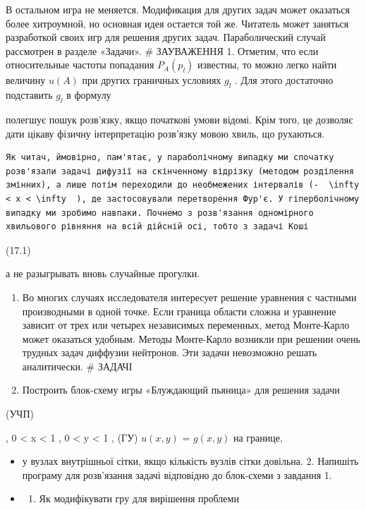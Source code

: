 \documentclass[
  ukrainian,
]{article}
\providecommand{\tightlist}{%
  \setlength{\itemsep}{0pt}\setlength{\parskip}{0pt}}
\begin{document}
В остальном игра не меняется. Модификация для других задач может
оказаться более хитроумной, но основная идея остается той же. Читатель
может заняться разработкой своих игр для решения других задач.
Параболический случай рассмотрен в разделе «Задачи». \# ЗАУВАЖЕННЯ 1.
Отметим, что если относительные частоты попадания \(P_A(p_l)\) известны,
то можно легко найти величину \(u\left(A\right)\) при других граничных
условиях \(g_l\) . Для этого достаточно подставить \(g_l\) в формулу

полегшує пошук розв'язку, якщо початкові умови відомі. Крім того, це
дозволяє дати цікаву фізичну інтерпретацію розв'язку мовою хвиль, що
рухаються.

\begin{verbatim}
Як читач, ймовірно, пам'ятає, у параболічному випадку ми спочатку розв'язали задачі дифузії на скінченному відрізку (методом розділення змінних), а лише потім переходили до необмежених інтервалів (-  \infty < x < \infty  ), де застосовували перетворення Фур'є. У гіперболічному випадку ми зробимо навпаки. Почнемо з розв'язання одномірного хвильового рівняння на всій дійсній осі, тобто з задачі Коші
\end{verbatim}

(17.1)

а не разыгрывать вновь случайные прогулки.

\begin{enumerate}
\def\labelenumi{\arabic{enumi}.}
\setcounter{enumi}{1}
\tightlist
\item
  Во многих случаях исследователя интересует решение уравнения с
  частными производными в одной точке. Если граница области сложна и
  уравнение зависит от трех или четырех независимых переменных, метод
  Монте-Карло может оказаться удобным. Методы Монте-Карло возникли при
  решении очень трудных задач диффузии нейтронов. Эти задачи невозможно
  решать аналитически. \# ЗАДАЧІ
\item
  Построить блок-схему игры «Блуждающий пьяница» для решения задачи
\end{enumerate}

(УЧП)

, 0 \textless{} x \textless{} 1 , 0 \textless{} y \textless{} 1 , (ГУ)
\(u(x, y)\) = \(g(x, y)\) на границе,

\begin{itemize}
\item
  у вузлах внутрішньої сітки, якщо кількість вузлів сітки довільна. 2.
  Напишіть програму для розв'язання задачі відповідно до блок-схеми з
  завдання 1.
\item
  \begin{enumerate}
  \def\labelenumi{\arabic{enumi}.}
  \setcounter{enumi}{2}
  \tightlist
  \item
    Як модифікувати гру для вирішення проблеми
  \end{enumerate}
\end{itemize}
\end{document}
